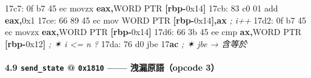 \documentclass[10pt,a4paper]{article}
\newenvironment{Shaded}{\begin{snugshade}}{\end{snugshade}}
\newcommand{\BaseNTok}[1]{\textcolor[rgb]{0.00,0.00,0.81}{#1}}
\newcommand{\CommentTok}[1]{\textcolor[rgb]{0.56,0.35,0.01}{\textit{#1}}}
\newcommand{\DataTypeTok}[1]{\textcolor[rgb]{0.13,0.29,0.53}{#1}}
\newcommand{\DecValTok}[1]{\textcolor[rgb]{0.00,0.00,0.81}{#1}}
\newcommand{\ErrorTok}[1]{\textcolor[rgb]{0.64,0.00,0.00}{\textbf{#1}}}
\newcommand{\KeywordTok}[1]{\textcolor[rgb]{0.13,0.29,0.53}{\textbf{#1}}}
\newcommand{\NormalTok}[1]{#1}
\newcommand{\OperatorTok}[1]{\textcolor[rgb]{0.81,0.36,0.00}{\textbf{#1}}}
\renewenvironment{Shaded}{%
  \def\FrameCommand{\fboxsep=3.2pt\colorbox{shadecolor}}%
  \MakeFramed{\advance\hsize-\width\FrameRestore\small}%
}{%
  \endMakeFramed
}
\begin{document}
\begin{Shaded}
\begin{Highlighting}[]
\NormalTok{17c7: 0f b7 }\DecValTok{45}\NormalTok{ ec            movzx  }\KeywordTok{eax}\OperatorTok{,}\DataTypeTok{WORD} \DataTypeTok{PTR} \OperatorTok{[}\KeywordTok{rbp}\OperatorTok{{-}}\BaseNTok{0x14}\OperatorTok{]}
\NormalTok{17cb: 83 c0 }\DecValTok{01}\NormalTok{               add    }\KeywordTok{eax}\OperatorTok{,}\BaseNTok{0x1}
\NormalTok{17ce: 66 89 45 ec            mov    }\DataTypeTok{WORD} \DataTypeTok{PTR} \OperatorTok{[}\KeywordTok{rbp}\OperatorTok{{-}}\BaseNTok{0x14}\OperatorTok{],}\KeywordTok{ax} \CommentTok{; i++}
\NormalTok{17d2: 0f b7 }\DecValTok{45}\NormalTok{ ec            movzx  }\KeywordTok{eax}\OperatorTok{,}\DataTypeTok{WORD} \DataTypeTok{PTR} \OperatorTok{[}\KeywordTok{rbp}\OperatorTok{{-}}\BaseNTok{0x14}\OperatorTok{]}
\NormalTok{17d6: 66 3b 45 ee            cmp    }\KeywordTok{ax}\OperatorTok{,}\DataTypeTok{WORD} \DataTypeTok{PTR} \OperatorTok{[}\KeywordTok{rbp}\OperatorTok{{-}}\BaseNTok{0x12}\OperatorTok{]} \CommentTok{; ✶ i \textless{}= n ?}
\NormalTok{17da: 76 d0                  jbe    }\DecValTok{17}\ErrorTok{ac}                  \CommentTok{; ✶ jbe → 含等於}
\end{Highlighting}
\end{Shaded}

\paragraph{\texorpdfstring{4.9 \texttt{send\_\allowbreak{}state} @ \texttt{0x1810}
------ \textbf{洩漏原語}（opcode
3）}{4.9 send\_state @ 0x1810 ------ 洩漏原語（opcode 3）}}\label{send_state-0x1810-ux6d29ux6f0fux539fux8a9eopcode-3}
\end{document}
